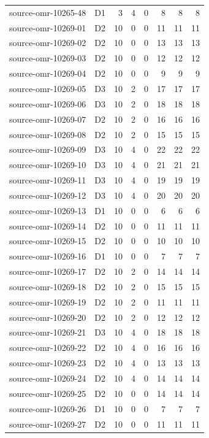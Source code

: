\begin{longtable}{p{}lrrrrrr}
source-omr-10265-48 & D1 & 3 & 4 & 0 & 8 & 8 & 8\\
source-omr-10269-01 & D2 & 10 & 0 & 0 & 11 & 11 & 11\\
source-omr-10269-02 & D2 & 10 & 0 & 0 & 13 & 13 & 13\\
source-omr-10269-03 & D2 & 10 & 0 & 0 & 12 & 12 & 12\\
source-omr-10269-04 & D2 & 10 & 0 & 0 & 9 & 9 & 9\\
source-omr-10269-05 & D3 & 10 & 2 & 0 & 17 & 17 & 17\\
source-omr-10269-06 & D3 & 10 & 2 & 0 & 18 & 18 & 18\\
source-omr-10269-07 & D2 & 10 & 2 & 0 & 16 & 16 & 16\\
source-omr-10269-08 & D2 & 10 & 2 & 0 & 15 & 15 & 15\\
source-omr-10269-09 & D3 & 10 & 4 & 0 & 22 & 22 & 22\\
source-omr-10269-10 & D3 & 10 & 4 & 0 & 21 & 21 & 21\\
source-omr-10269-11 & D3 & 10 & 4 & 0 & 19 & 19 & 19\\
source-omr-10269-12 & D3 & 10 & 4 & 0 & 20 & 20 & 20\\
source-omr-10269-13 & D1 & 10 & 0 & 0 & 6 & 6 & 6\\
source-omr-10269-14 & D2 & 10 & 0 & 0 & 11 & 11 & 11\\
source-omr-10269-15 & D2 & 10 & 0 & 0 & 10 & 10 & 10\\
source-omr-10269-16 & D1 & 10 & 0 & 0 & 7 & 7 & 7\\
source-omr-10269-17 & D2 & 10 & 2 & 0 & 14 & 14 & 14\\
source-omr-10269-18 & D2 & 10 & 2 & 0 & 15 & 15 & 15\\
source-omr-10269-19 & D2 & 10 & 2 & 0 & 11 & 11 & 11\\
source-omr-10269-20 & D2 & 10 & 2 & 0 & 12 & 12 & 12\\
source-omr-10269-21 & D3 & 10 & 4 & 0 & 18 & 18 & 18\\
source-omr-10269-22 & D2 & 10 & 4 & 0 & 16 & 16 & 16\\
source-omr-10269-23 & D2 & 10 & 4 & 0 & 13 & 13 & 13\\
source-omr-10269-24 & D2 & 10 & 4 & 0 & 14 & 14 & 14\\
source-omr-10269-25 & D2 & 10 & 0 & 0 & 14 & 14 & 14\\
source-omr-10269-26 & D1 & 10 & 0 & 0 & 7 & 7 & 7\\
source-omr-10269-27 & D2 & 10 & 0 & 0 & 11 & 11 & 11\\

\end{longtable}
